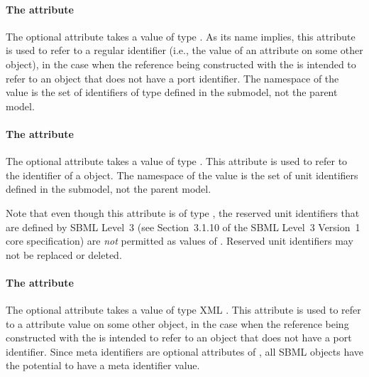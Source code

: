 \paragraph{The \hspace*{1pt} attribute}

The optional attribute  takes a value of type
.  As its name implies, this attribute is used to
refer to a regular identifier (i.e., the value of an 
attribute on some other object), in the case when the reference being
constructed with the \SBaseRef is intended to refer to an object that
does not have a port identifier.  The namespace of the 
value is the set of identifiers of type  defined in the
submodel, not the parent model.


\paragraph{The \hspace*{1pt} attribute}

The optional attribute  takes a value of type
.  This attribute is used to refer to the identifier
of a \UnitDefinition object.  The namespace of the 
value is the set of unit identifiers defined in the submodel, not the
parent model.

Note that even though this attribute is of type ,
the reserved unit identifiers that are defined by SBML Level~3 (see
Section~3.1.10 of the SBML Level~3 Version~1 core specification) are
\emph{not} permitted as values of .  Reserved unit
identifiers may not be replaced or deleted.


\paragraph{The \hspace*{1pt} attribute}

The optional attribute  takes a value of type XML
.  This attribute is used to refer to a 
attribute value on some other object, in the case when the reference
being constructed with the \SBaseRef is intended to refer to an object
that does not have a port identifier.  Since meta identifiers are
optional attributes of \SBase, all SBML objects have the potential to
have a meta identifier value.


